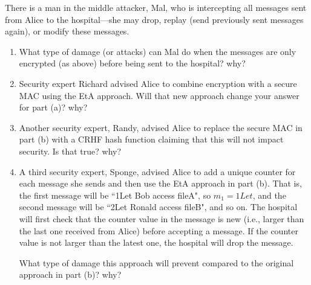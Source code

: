 \documentclass[12pt]{article}
\begin{document}
\begin{enumerate}
    There is a man in the middle attacker, Mal, who is intercepting all messages sent from Alice to the hospital---she may drop, replay (send previously sent messages again), or modify these  messages.
    \begin{enumerate}
        \item What type of damage (or attacks) can Mal do when the messages are only encrypted (as above) before being sent to the hospital? why?
        
        \item Security expert Richard advised Alice to combine encryption with a secure MAC using the EtA approach. Will that new approach change your answer for part (a)? why?
        
        \item Another security expert, Randy, advised Alice to replace the secure MAC in part (b) with a CRHF hash function claiming that this will not impact security. Is that true? why?
        
        \item A third security expert, Sponge, advised Alice to add a unique counter for each message she sends and then use the EtA approach in part (b). That is, the first message will be ``1Let Bob access fileA", so $m_1 = 1Let$, and the second message will be ``2Let Ronald access fileB", and so on. The hospital will first check that the counter value in the message is new (i.e., larger than the last one received from Alice) before accepting a message. If the counter value is not larger than the latest one, the hospital will drop the message. 

        What type of damage this approach will prevent compared to the original approach in part (b)? why?
    \end{enumerate}
\end{enumerate}
\end{document}
